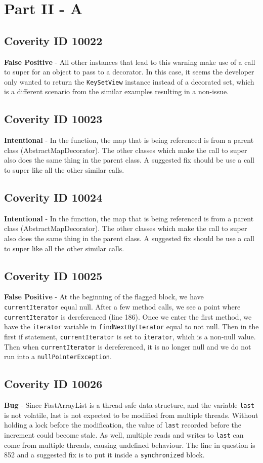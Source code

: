\documentclass[12pt]{article}
\begin{document}
\section*{Part II - A}
\subsection*{Coverity ID 10022}
\textbf{False Positive} - All other instances that lead to this warning make use of a call to super for an object to pass to a decorator. In this case, it seems the developer only wanted to return the \texttt{KeySetView} instance instead of a decorated set, which is a different scenario from the similar examples resulting in a non-issue.
\subsection*{Coverity ID 10023}
\textbf{Intentional} - In the function, the map that is being referenced is from a parent class (AbstractMapDecorator). The other classes which make the call to super also does the same thing in the parent class. A suggested fix should be use a call to super like all the other similar calls.
\subsection*{Coverity ID 10024}
\textbf{Intentional} - In the function, the map that is being referenced is from a parent class (AbstractMapDecorator). The other classes which make the call to super also does the same thing in the parent class. A suggested fix should be use a call to super like all the other similar calls.
\subsection*{Coverity ID 10025}
\textbf{False Positive} - At the beginning of the flagged block, we have \texttt{currentIterator} equal null. After a few method calls, we see a point where \texttt{currentIterator} is dereferenced (line 186). Once we enter the first method, we have the \texttt{iterator} variable in \texttt{findNextByIterator} equal to not null. Then in the first if statement, \texttt{currentIterator} is set to \texttt{iterator}, which is a non-null value. Then when \texttt{currentIterator} is dereferenced, it is no longer null and we do not run into a \texttt{nullPointerException}.
\subsection*{Coverity ID 10026}
\textbf{Bug} - Since FastArrayList is a thread-safe data structure, and the variable \texttt{last} is not volatile, last is not expected to be modified from multiple threads. Without holding a lock before the modification, the value of \texttt{last} recorded before the increment could become stale. As well, multiple reads and writes to \texttt{last} can come from multiple threads, causing undefined behaviour. The line in question is 852 and a suggested fix is to put it inside a \texttt{synchronized} block.
\end{document}

